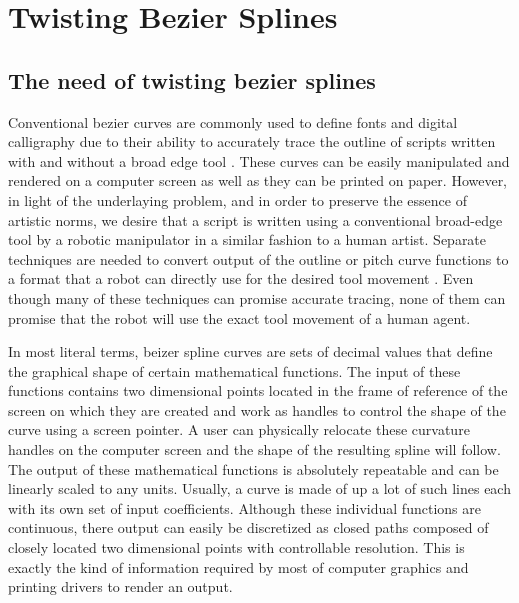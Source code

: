 \section{Twisting Bezier Splines}
\label{Chapter:SplineModelling}

    \subsection{The need of twisting bezier splines}
    Conventional bezier curves are commonly used to define fonts \cite{bib28} and digital calligraphy \cite{bib29} due to their ability to accurately trace the outline of scripts written with and without a broad edge tool \cite{bib29, bib30}. These curves can be easily manipulated \cite{bib31} and rendered on a computer screen as well as they can be printed on paper. However, in light of the underlaying problem, and in order to preserve the essence of artistic norms, we desire that a script is written using a conventional broad-edge tool by a robotic manipulator in a similar fashion to a human artist. Separate techniques are needed to convert output of the outline or pitch curve functions to a format that a robot can directly use for the desired tool movement \cite{bib32, bib33, bib34}. Even though many of these techniques can promise accurate tracing, none of them can promise that the robot will use the exact tool movement of a human agent.

    In most literal terms, beizer spline curves are sets of decimal values that define the graphical shape of certain mathematical functions. The input of these functions contains two dimensional points located in the frame of reference of the screen on which they are created and work as handles to control the shape of the curve using a screen pointer. A user can physically relocate these curvature handles on the computer screen and the shape of the resulting spline will follow. The output of these mathematical functions is absolutely repeatable and can be linearly scaled to any units. Usually, a curve is made of up a lot of such lines each with its own set of input coefficients. Although these individual functions are continuous, there output can easily be discretized as closed paths composed of closely located two dimensional points with controllable resolution. This is exactly the kind of information required by most of computer graphics and printing drivers to render an output.


